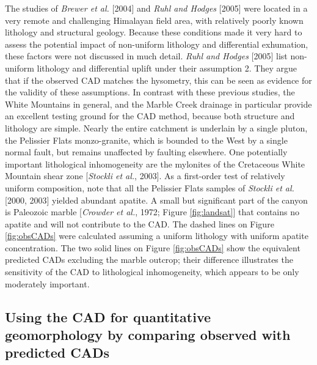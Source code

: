 \documentclass[12pt,twoside]{article}
\begin{document}
The studies  of {\it Brewer et  al.} [2004] and {\it  Ruhl and Hodges}
[2005] were located  in a very remote and  challenging Himalayan field
area, with  relatively poorly known lithology and  structural geology. 
Because these  conditions made  it very hard  to assess  the potential
impact  of non-uniform  lithology and  differential  exhumation, these
factors  were not  discussed in  much  detail. {\it  Ruhl and  Hodges}
[2005] list non-uniform lithology  and differential uplift under their
assumption  2.   They argue  that  if  the  observed CAD  matches  the
hysometry,  this can be  seen as  evidence for  the validity  of these
assumptions.   In  contrast with  these  previous  studies, the  White
Mountains  in general,  and the  Marble Creek  drainage  in particular
provide an excellent  testing ground for the CAD  method, because both
structure and  lithology are simple.   Nearly the entire  catchment is
underlain by a single pluton, the Pelissier Flats monzo-granite, which
is  bounded  to  the  West  by  a single  normal  fault,  but  remains
unaffected   by  faulting   elsewhere.    One  potentially   important
lithological inhomogeneity  are the mylonites of  the Cretaceous White
Mountain shear  zone [{\it Stockli  et al.}, 2003].  As  a first-order
test of  relatively uniform composition,  note that all  the Pelissier
Flats samples of  {\it Stockli et al.}  [2000,  2003] yielded abundant
apatite.   A small  but significant  part of  the canyon  is Paleozoic
marble  [{\it Crowder  et al.},  1972; Figure  \ref{fig:landsat}] that
contains no  apatite and will not  contribute to the  CAD.  The dashed
lines on  Figure \ref{fig:obsCADs} were calculated  assuming a uniform
lithology with uniform apatite  concentration.  The two solid lines on
Figure \ref{fig:obsCADs} show  the equivalent predicted CADs excluding
the marble  outcrop; their  difference illustrates the  sensitivity of
the  CAD  to lithological  inhomogeneity,  which  appears  to be  only
moderately important.

\subsection{Using the CAD for quantitative geomorphology by comparing observed
  with predicted CADs}
\label{sec:observedCAD}
\end{document}
